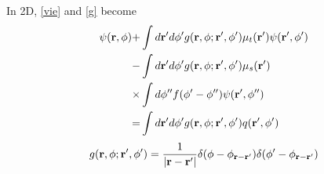 \documentclass[main]{subfiles}
\begin{document}
In 2D, \eqref{vie} and \eqref{g} become
\begin{equation} \label{vie2d}
	\begin{split} 
		\psi(\mathbf{r},\phi) +& \int d\mathbf{r}^{\prime} d\phi^{\prime}
		g(\mathbf{r},\phi;\mathbf{r}^{\prime},\phi^{\prime})
		\mu_t(\mathbf{r}^{\prime})\psi(\mathbf{r}^{\prime},\phi^{\prime})
		\\
		-& \int d\mathbf{r}^{\prime} d\phi^{\prime} g(\mathbf{r},\phi;\mathbf{r}^{\prime},\phi^{\prime})
		\mu_s(\mathbf{r}^{\prime}) 
		\\
		\times& \int d\phi^{{\prime\prime}}
		f(\phi^{\prime}-\phi^{{\prime\prime}})\psi(\mathbf{r}^{\prime},\phi^{{\prime\prime}})
		\\
		=& \int d\mathbf{r}^{\prime} d\phi^{\prime}
		g(\mathbf{r},\phi;\mathbf{r}^{\prime},\phi^{\prime})q(\mathbf{r}^{\prime},\phi^{\prime})
	\end{split}
\end{equation}
\begin{equation} \label{g2d}
	g(\mathbf{r},\phi;\mathbf{r}^{\prime},\phi^{\prime}) = \frac{1}{\left| \mathbf{r}-\mathbf{r}^{\prime} \right|} 
	\delta(\phi-\phi_{\mathbf{r}-\mathbf{r}^{\prime}})
	\delta(\phi^{\prime}-\phi_{\mathbf{r}-\mathbf{r}^{\prime}})
\end{equation}


\end{document}
